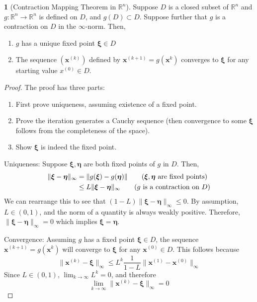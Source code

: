 \documentclass[12pt]{article}
\theoremstyle{definition}
\newtheorem{theorem}{\color{ForestGreen}{\textbf{Theorem}}}
\newcommand{\R}{\mathbb{R}}
\newcommand{\norm}[1]{\lVert#1\rVert}
\newcommand{\x}{\bm{x}}
\newcommand{\xib}{\bm{\xi}}
\theoremstyle{definition}
\begin{document}
\begin{theorem}[Contraction Mapping Theorem in $\R^n$]
Suppose $D$ is a closed subset of $\R^n$ and $g: \R^n \to \R^n$ is defined on $D$, and $g(D) \subset D$. Suppose further that $g$ is a contraction on $D$ in the $\infty$-norm. Then,
\begin{enumerate}
	\item $g$ has a unique fixed point $\xib \in D$
	\item The sequence $(\x^{(k)})$ defined by $\x^{(k+1)} = g(\x^{k})$ converges to $\xib$ for any starting value $x^{(0)} \in D$.
\end{enumerate}
\end{theorem}

\begin{proof}
The proof has three parts:
\begin{enumerate}
	\item First prove uniqueness, assuming existence of a fixed point.
	\item Prove the iteration generates a Cauchy sequence (then convergence to some $\xib$ follows from the completeness of the space).
	\item Show $\xib$ is indeed the fixed point.
\end{enumerate}

Uniqueness: Suppose $\xib, \bm \eta$ are both fixed points of $g$ in $D$. Then,
\begin{align*}
	\norm{\xib - \bm \eta}_\infty &= \norm{g(\xib) - g(\bm \eta)} \tag{$\xib, \bm \eta$ are fixed points} \\
	&\leq L \norm{\xib - \bm \eta}_\infty \tag{$g$ is a contraction on $D$}
\end{align*}
We can rearrange this to see that $(1-L)\norm{\xib - \bm \eta}_\infty \leq 0$. By assumption, $L\in (0,1)$, and the norm of a quantity is always weakly positive. Therefore, $\norm{\xib - \bm \eta}_\infty = 0$ which implies $\xib = \bm \eta$. 

Convergence: Assuming $g$ has a fixed point $\xib \in D$, the sequence $\x^{(k+1)} = g(\x^{k})$ will converge to $\xib$ for any $\x^{(0)} \in D$. This follows because
\begin{equation}
	\norm{\x^{(k)} - \xib}_\infty \leq L^k \frac{1}{1-L} \norm{\x^{(1)} - \x^{(0)}}_\infty
\end{equation}
Since $L \in (0,1)$, $\lim_{k\to\infty} L^k = 0$, and therefore
\begin{equation}
	\lim_{k \to \infty} \norm{\x^{(k)} - \xib}_\infty = 0
\end{equation}


\end{proof}
\end{document}
